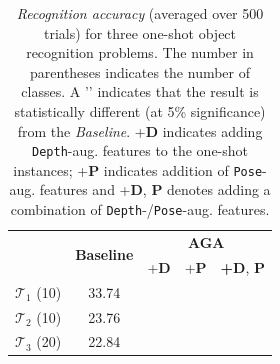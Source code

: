 \documentclass[10pt,twocolumn,letterpaper]{article}
\begin{document}
\begin{table}[t!]
\small
\begin{tabular}{rcccc}
\hline
& \multirow{2}{*}{\textbf{Baseline}} & \multicolumn{3}{c}{\textbf{AGA}}\\
& 						     &  +\textbf{D} & +\textbf{P} &  \textbf{+D}, \textbf{P} \\
\hline
$\mathcal{T}_1$ (10)  	& 33.74	
					&  \cellcolor{green!30}{38.84~\checkmark} 
					&  \cellcolor{green!05}{36.01~\checkmark} 
					&  \cellcolor{green!60}{39.12~\checkmark}\\
$\mathcal{T}_2$ (10) 	& 23.76  	
					&  \cellcolor{green!30}{28.95~\checkmark}
					&  \cellcolor{green!05}{27.01~\checkmark}
					&  \cellcolor{green!60}{30.13~\checkmark}\\
$\mathcal{T}_3$ (20) 	& 22.84	
					&  \cellcolor{green!30}{25.84~\checkmark}
					& \cellcolor{green!05}{24.35~\checkmark}
					&  \cellcolor{green!60}{26.91~\checkmark} \\ 
					\hline
\end{tabular}
\caption{\label{table:oneshot} \emph{Recognition accuracy} (averaged over 500 trials) 
for three one-shot object recognition problems.
The number in parentheses indicates the number of classes.
A '\checkmark' indicates that the result is statistically different (at 5\% significance) 
from the \emph{Baseline}. +\textbf{D} indicates adding \texttt{Depth}-aug. 
features to the one-shot instances; +\textbf{P} indicates addition of \texttt{Pose}-aug. features
and +\textbf{D}, \textbf{P} denotes adding a combination of \texttt{Depth}-/\texttt{Pose}-aug. 
features.}
\end{table}
\end{document}
